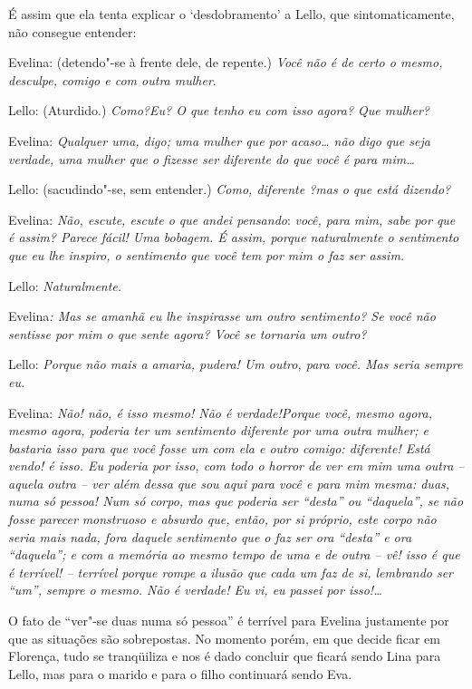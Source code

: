 É assim que ela tenta explicar o `desdobramento' a Lello, que
sintomaticamente, não consegue entender:

Evelina: (detendo"-se à frente dele, de repente.) \emph{Você não é de
certo o mesmo, desculpe, comigo e com outra mulher}.

Lello: (Aturdido.) \emph{Como?Eu? O que tenho eu com isso agora? Que
mulher?}

Evelina: \emph{Qualquer uma, digo; uma mulher que por acaso\ldots{} não digo
que seja verdade, uma mulher que o fizesse ser diferente do que você é
para mim\ldots{}}

Lello: (sacudindo"-se, sem entender.) \emph{Como, diferente ?mas o que
está dizendo?}

Evelina: \emph{Não, escute, escute o que andei pensando}: \emph{você,
para mim, sabe por que é assim? Parece fácil! Uma bobagem. É assim,
porque naturalmente o sentimento que eu lhe inspiro, o sentimento que
você tem por mim o faz ser assim. }

Lello: \emph{Naturalmente.}

Evelina\emph{: Mas se amanhã eu lhe inspirasse um outro sentimento? Se
você não sentisse por mim o que sente agora? Você se tornaria um outro?}

Lello: \emph{Porque não mais a amaria, pudera! Um outro, para você. Mas
seria sempre eu. }

Evelina: \emph{Não! não, é isso mesmo! Não é verdade!Porque você, mesmo
agora, mesmo agora, poderia ter um sentimento diferente por uma outra
mulher; e bastaria isso para que você fosse um com ela e outro comigo:
diferente! Está vendo! é isso. Eu poderia por isso, com todo o horror de
ver em mim uma outra -- aquela outra -- ver além dessa que sou aqui para
você e para mim mesma: duas, numa só pessoa! Num só corpo, mas que
poderia ser ``desta'' ou ``daquela'', se não fosse parecer}
\emph{monstruoso e absurdo que, então, por si próprio, este corpo não
seria mais nada, fora daquele sentimento que o faz ser ora ``desta'' e
ora ``daquela''; e com a memória ao mesmo tempo de uma e de outra -- vê!
isso é que é terrível! -- terrível porque rompe a ilusão que cada um faz
de si, lembrando ser ``um'', sempre o mesmo. Não é verdade! Eu vi, eu
passei por isso!\ldots{}}

O fato de ``ver"-se duas numa só pessoa'' é terrível para Evelina
justamente por que as situações são sobrepostas. No momento porém, em
que decide ficar em Florença, tudo se tranqüiliza e nos é dado concluir
que ficará sendo Lina para Lello, mas para o marido e para o filho
continuará sendo Eva.

